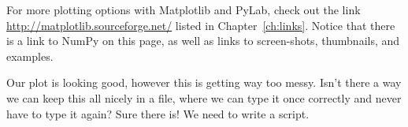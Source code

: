 For more
plotting options with Matplotlib and PyLab, check out the link
\url{http://matplotlib.sourceforge.net/} listed in
Chapter~\ref{ch:links}.  Notice that there is a link to NumPy on this
page, as well as links to screen-shots, thumbnails, and examples.

Our plot is looking good, however this is getting way too messy.
Isn't there a way we can keep this all nicely in a file, where we can
type it once correctly and never have to type it again?  Sure there
is!  We need to write a script.

